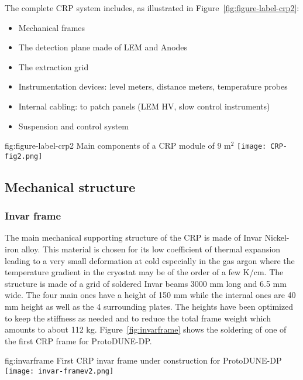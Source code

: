 The complete CRP system includes, as illustrated in Figure~\ref{fig:figure-label-crp2}:
\begin{itemize}
\item Mechanical frames  
\item The detection plane made of LEM and Anodes 
\item The extraction grid
\item Instrumentation devices: level meters, distance meters, temperature probes
\item Internal cabling: to patch panels (LEM HV, slow control instruments)
\item Suspension and control system
\end{itemize}

\begin{dunefigure}{fig:figure-label-crp2}
{Main components of a CRP module of 9 m$^{2}$}
\texttt{[image: CRP-fig2.png]}
\end{dunefigure}

\subsection{Mechanical structure}
\label{sec:fddp-crp-mechanics}
\subsubsection{Invar frame}

The main mechanical supporting structure of the CRP is made of Invar Nickel-iron alloy. This material is chosen for its low coefficient of thermal expansion leading to a very small deformation at cold especially in the gas argon where the temperature gradient in the cryostat may be of the order of a few K/cm.
The structure is made of a grid of soldered Invar beams 3000 mm long and 6.5 mm wide. The four main ones have a height of 150 mm while the internal ones are 40 mm height as well as the 4 surrounding plates. The heights have been optimized to keep the stiffness as needed and to reduce the total frame weight which amounts to about 112 kg.
Figure~\ref{fig:invarframe} shows the soldering of one of the first CRP frame for ProtoDUNE-DP.
\begin{dunefigure}{fig:invarframe}
{First CRP invar frame under construction for ProtoDUNE-DP}
\texttt{[image: invar-framev2.png]}
\end{dunefigure}


